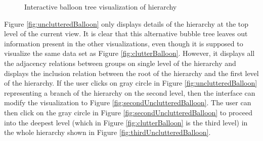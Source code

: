 \begin{figure}[htb]
\centering
{}
\caption{Interactive balloon tree visualization of hierarchy}
\label{fig:interactiveBalloon}
\end{figure}

Figure \ref{fig:unclutteredBalloon} only displays details of the hierarchy at the top level of the current view. It is clear that this alternative bubble tree leaves out information present in the other visualizations, even though it is supposed to visualize the same data set as Figure \ref{fig:clutterBalloon}. However, it displays all the adjacency relations between groups on single level of the hierarchy and displays the inclusion relation between the root of the hierarchy and the first level of the hierarchy. If the user clicks on gray circle in Figure \ref{fig:unclutteredBalloon} representing a branch of the hierarchy on the second level, then the interface can modify the visualization to Figure \ref{fig:secondUnclutteredBalloon}. The user can then click on the gray circle in Figure \ref{fig:secondUnclutteredBalloon} to proceed into the deepest level (which in Figure \ref{fig:clutterBalloon} is the third level) in the whole hierarchy shown in Figure \ref{fig:thirdUnclutteredBalloon}. 

